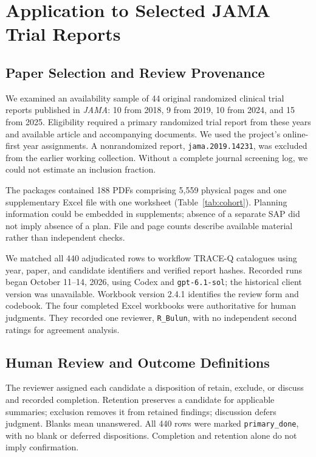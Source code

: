 \documentclass[12pt,a4paper]{article}
\begin{document}
\section{Application to Selected JAMA Trial Reports}
\label{sec:application}

\subsection{Paper Selection and Review Provenance}

We examined an availability sample of 44 original randomized clinical trial reports published in \textit{JAMA}: 10 from 2018, 9 from 2019, 10 from 2024, and 15 from 2025. Eligibility required a primary randomized trial report from these years and available article and accompanying documents. We used the project's online-first year assignments. A nonrandomized report, \texttt{jama.2019.14231}, was excluded from the earlier working collection. Without a complete journal screening log, we could not estimate an inclusion fraction.

The packages contained 188 PDFs comprising 5,559 physical pages and one supplementary Excel file with one worksheet (Table~\ref{tab:cohort}). Planning information could be embedded in supplements; absence of a separate SAP did not imply absence of a plan. File and page counts describe available material rather than independent checks.

We matched all 440 adjudicated rows to workflow TRACE-Q catalogues using year, paper, and candidate identifiers and verified report hashes. Recorded runs began October 11--14, 2026, using Codex and \texttt{gpt-6.1-sol}; the historical client version was unavailable. Workbook version 2.4.1 identifies the review form and codebook. The four completed Excel workbooks were authoritative for human judgments. They recorded one reviewer, \texttt{R\_Bulun}, with no independent second ratings for agreement analysis.

\subsection{Human Review and Outcome Definitions}
\label{sec:codebook}

The reviewer assigned each candidate a disposition of retain, exclude, or discuss and recorded completion. Retention preserves a candidate for applicable summaries; exclusion removes it from retained findings; discussion defers judgment. Blanks mean unanswered. All 440 rows were marked \texttt{primary\_done}, with no blank or deferred dispositions. Completion and retention alone do not imply confirmation.
\end{document}
